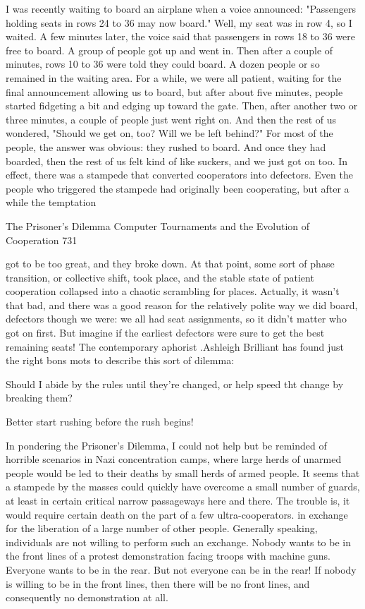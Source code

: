         I was recently waiting to board an airplane when a voice announced: "Passengers
holding seats in rows 24 to 36 may now board." Well, my seat was in row 4, so I waited.
A few minutes later, the voice said that passengers in rows 18 to 36 were free to board. A
group of people got up and went in. Then after a couple of minutes, rows 10 to 36 were
told they could board. A dozen people or so remained in the waiting area. For a while, we
were all patient, waiting for the final announcement allowing us to board, but after about
five minutes, people started fidgeting a bit and edging up toward the gate. Then, after
another two or three minutes, a couple of people just went right on. And then the rest of
us wondered, "Should we get on, too? Will we be left behind?" For most of the people,
the answer was obvious: they rushed to board. And once they had boarded, then the rest
of us felt kind of like suckers, and we just got on too. In effect, there was a stampede that
converted cooperators into defectors. Even the people who triggered the stampede had
originally been cooperating, but after a while the temptation




The Prisoner's Dilemma Computer Tournaments and the Evolution of Cooperation             731

got to be too great, and they broke down. At that point, some sort of phase transition, or
collective shift, took place, and the stable state of patient cooperation collapsed into a
chaotic scrambling for places. Actually, it wasn't that bad, and there was a good reason
for the relatively polite way we did board, defectors though we were: we all had seat
assignments, so it didn't matter who got on first. But imagine if the earliest defectors were
sure to get the best remaining seats! The contemporary aphorist .Ashleigh Brilliant has
found just the right bons mots to describe this sort of dilemma:

Should I abide by the rules until they're changed, or help speed tht change by breaking
them?

       Better start rushing before the rush begins!

In pondering the Prisoner's Dilemma, I could not help but be reminded of horrible
scenarios in Nazi concentration camps, where large herds of unarmed people would be
led to their deaths by small herds of armed people. It seems that a stampede by the
masses could quickly have overcome a small number of guards, at least in certain critical
narrow passageways here and there. The trouble is, it would require certain death on the
part of a few ultra-cooperators. in exchange for the liberation of a large number of other
people. Generally speaking, individuals are not willing to perform such an exchange.
Nobody wants to be in the front lines of a protest demonstration facing troops with
machine guns. Everyone wants to be in the rear. But not everyone can be in the rear! If
nobody is willing to be in the front lines, then there will be no front lines, and
consequently no demonstration at all.


